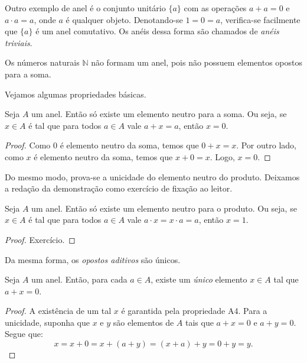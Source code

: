Outro exemplo de anel é o conjunto unitário $\{a\}$ com as operações $a+a=0$ e $a\cdot a=a$, onde $a$ é qualquer objeto. Denotando-se $1=0=a$, verifica-se facilmente que $\{a\}$ é um anel comutativo.
Os anéis dessa forma são chamados de \emph{anéis triviais}.

Os números naturais $\mathbb{N}$ não formam um anel, pois não possuem elementos opostos para a soma.

Vejamos algumas propriedades básicas.

\begin{proposition}
    Seja $A$ um anel. Então só existe um elemento neutro para a soma.
    Ou seja, se $x \in A$ é tal que para todos $a \in A$ vale $a+x=a$, então $x=0$.
\end{proposition}
\begin{proof}
    Como $0$ é elemento neutro da soma, temos que $0+x=x$.
    Por outro lado, como $x$ é elemento neutro da soma, temos que $x+0=x$.
    Logo, $x=0$.
\end{proof}

Do mesmo modo, prova-se a unicidade do elemento neutro do produto.
Deixamos a redação da demonstração como exercício de fixação ao leitor. 

\begin{proposition}\label{proposition:unicidadeNeutroProduto}
    Seja $A$ um anel.
    Então só existe um elemento neutro para o produto.
    Ou seja, se $x \in A$ é tal que para todos $a \in A$ vale $a\cdot x=x\cdot a=a$, então $x=1$.
\end{proposition}
\begin{proof}
    Exercício.
\end{proof}



Da mesma forma, os \emph{opostos aditivos} são únicos.

\begin{proposition}
    Seja $A$ um anel.
    Então, para cada $a \in A$, existe um \emph{único} elemento $x \in A$ tal que $a+x=0$.
\end{proposition}
\begin{proof}
    A existência de um tal $x$ é garantida pela propriedade A4.
    Para a unicidade, suponha que $x$ e $y$ são elementos de $A$ tais que $a+x=0$ e $a+y=0$.
    Segue que:
    \begin{equation*}
        x=x+0=x+(a+y)=(x+a)+y=0+y=y.
    \end{equation*}
\end{proof}

